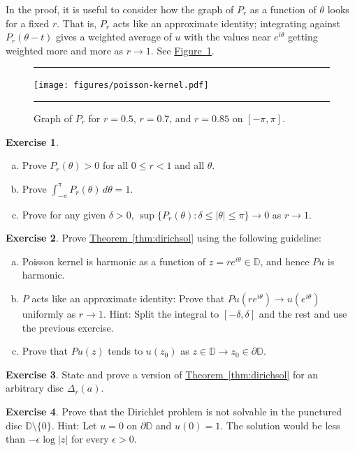 \documentclass[12pt,openany]{book}
\newcommand{\sabs}[1]{\lvert {#1} \rvert}
\newcommand{\abs}[1]{\left\lvert {#1} \right\rvert}
\newcommand{\D}{{\mathbb{D}}}
\theoremstyle{plain}
\theoremstyle{remark}
\theoremstyle{definition}
\newenvironment{exbox}{%
    \def\FrameCommand{\vrule width 1pt \relax\hspace{10pt}}%
    \MakeFramed{\advance\hsize-\width\FrameRestore}%
}{%
    \endMakeFramed
}
\newenvironment{exparts}{%
    \leavevmode\begin{enumerate}[a),noitemsep,topsep=0pt,parsep=0pt,partopsep=0pt]
}{%
    \end{enumerate}
}
\newenvironment{myfig}{%
\begin{figure}[h!t]
\noindent\rule{\textwidth}{0.5pt}\vspace{12pt}\par\centering}%
{\par\noindent\rule{\textwidth}{0.5pt}
\end{figure}}
\theoremstyle{exercise}
\newtheorem{exercise}{Exercise}[section]
\theoremstyle{example}
\newcommand{\figureref}[1]{\hyperref[#1]{Figure~\ref*{#1}}}
\newcommand{\thmref}[1]{\hyperref[#1]{Theorem~\ref*{#1}}}
\begin{document}
In the proof, it is useful to consider how
the graph of $P_r$ as a function of $\theta$ looks for a fixed $r$.
That is, $P_r$ acts like an approximate identity;
integrating against $P_r(\theta-t)$ gives
a weighted average of $u$ with the values near $e^{i\theta}$ getting
weighted more and more as $r \to 1$.
See \figureref{fig:poisson-kernel}.

\begin{myfig}
\texttt{[image: figures/poisson-kernel.pdf]}
\caption{Graph of $P_r$ for $r=0.5$,
$r=0.7$, and $r=0.85$ on $[-\pi,\pi]$.\label{fig:poisson-kernel}}
\end{myfig}

\begin{exbox}
\begin{exercise}
\begin{exparts}
\item
Prove $P_r(\theta) > 0$ for all $0 \leq r < 1$ and all $\theta$.
\item
Prove $\int_{-\pi}^{\pi} P_r(\theta) \, d\theta = 1$.
\item
Prove for any given $\delta > 0$,
$\sup \{P_r(\theta) : \delta \leq \abs{\theta} \leq \pi \} \to 0$ as
$r \to 1$.
\end{exparts}
\end{exercise}

\begin{exercise}
\pagebreak[1]%
Prove \thmref{thm:dirichsol} using the following guideline:
\begin{exparts}
\item
Poisson kernel is harmonic
as a function of $z=re^{i\theta} \in \D$, and hence
$Pu$ is harmonic.
\item
$P$ acts like an
approximate identity: Prove that
$Pu(re^{i\theta}) \to u(e^{i\theta})$ uniformly as
$r \to 1$.  Hint: Split the integral to $[-\delta,\delta]$ and the rest
and use the previous exercise.
\item
Prove that $Pu(z)$ tends to $u(z_0)$ as
$z \in \D \to z_0 \in \partial \D$.
\end{exparts}
\end{exercise}

\begin{exercise}
\pagebreak[2]%
State and prove a version of \thmref{thm:dirichsol} for an arbitrary disc
$\Delta_r(a)$.
\end{exercise}

\begin{exercise}
Prove that the Dirichlet problem is not solvable in the punctured disc $\D
\setminus \{ 0 \}$.
Hint: Let $u = 0$ on $\partial \D$ and $u(0)=1$.
The solution would be
less than $- \epsilon \log \sabs{z}$ for every $\epsilon > 0$.
\end{exercise}
\end{exbox}
\end{document}
